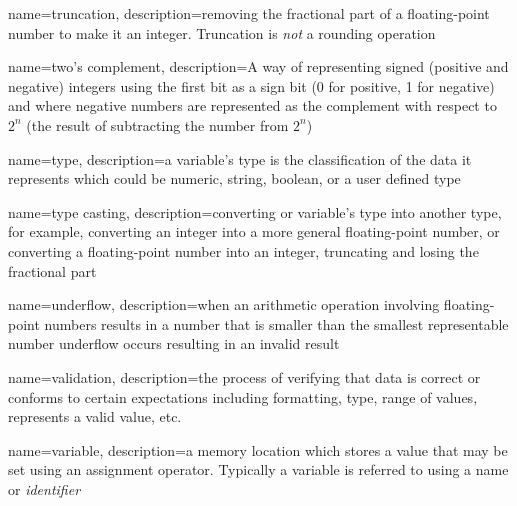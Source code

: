 {
  name=truncation,
  description={removing the fractional part of a floating-point number to make it an integer.  Truncation is \emph{not} a 
  	rounding operation}
}

{
  name=two's complement,
  description={A way of representing signed (positive and negative) integers using the first bit as a sign bit (0 for positive, 1 for negative) and where negative numbers are represented as the complement with respect to $2^n$ (the result of subtracting the number from $2^n$) }
}

{
  name=type,
  description={a variable's type is the classification of the data it represents which could be numeric, string, boolean, or
  	a user defined type}
}

{
  name=type casting,
  description={converting or variable's type into another type, for example, converting an integer into a more general floating-point number, or
  	converting a floating-point number into an integer, truncating and losing the fractional part}
}

{
  name=underflow,
  description={when an arithmetic operation involving floating-point numbers results in a number that is smaller than the smallest representable
  number underflow occurs resulting in an invalid result}
}

{
  name=validation,
  description={the process of verifying that data is correct or conforms to certain expectations including formatting, type, range of values,
  	represents a valid value, etc.}
}

{
  name=variable,
  description={a memory location which stores a value that may be set using an assignment operator.  Typically a variable
  	is referred to using a name or \emph{identifier}}
}







